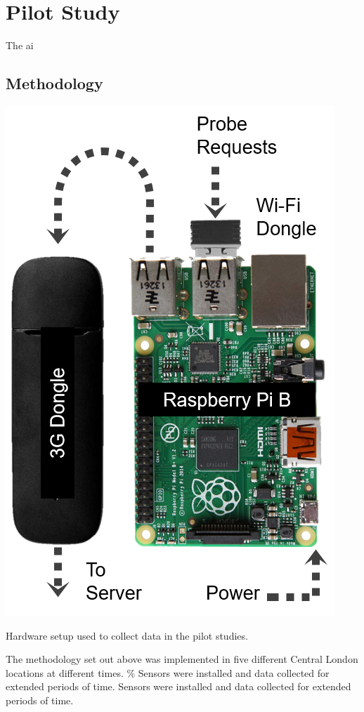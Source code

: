 \section{Pilot Study}

The ai

\subsection{Methodology}

\begin{marginfigure}[2cm]
  \includegraphics{images/pilot-hardware.png}
  \caption{Hardware setup used to collect data in the pilot studies.}
  \label{figure:collection:pilot:hardware}
\end{marginfigure}

The methodology set out above was implemented in five different Central London locations at different times.
\% Sensors were installed and data collected for extended periods of time.
Sensors were installed and data collected for extended periods of time.

